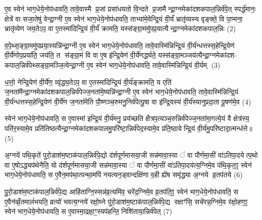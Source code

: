 ए॒व स्वेन॑ भाग॒धेये॒नोप॑धावति॒ तावे॒वास्मै प्र॒जां प्रसा॑धयतो वि॒न्दते प्र॒जामैन्द्रा॒ग्नमेका॑दशकपाल॒न्निर्व॑पे॒त् स्पर्द्ध॑मानः॒ क्षेत्रे॑ वा सजा॒तेषु॑ वेन्द्रा॒ग्नी ए॒व स्वेन॑ भाग॒धेये॒नोप॑धावति॒ ताभ्या॑मे॒वेन्द्रि॒यं वी॒र्यं॑ भ्रातृ॑व्यस्य वृङ्क्ते॒ वि पा॒प्मना॒ भ्रातृ॑व्येण जय॒तेऽप॒ वा ए॒तस्मा॑दिन्द्रि॒यं वी॒र्यं॑ क्रामति॒ यस्स॑ङ्ग्रा॒ममु॑पप्र॒यात्यैन्द्रा॒ग्नमेका॑दशकपाल॒न्निः (2)

व॒पे॒थ्स॒ङ्ग्रा॒ममु॑पप्रया॒स्यन्नि॑न्द्रा॒ग्नी ए॒व स्वेन॑ भाग॒धेये॒नोप॑धावति॒ तावे॒वास्मि॑न्निन्द्रि॒यं वी॒र्य॑न्धत्तस्स॒हेन्द्रि॒येण॑ वी॒र्ये॑णोप॒प्रया॑ति॒ जय॑ति॒ त स॑ङ्ग्रा॒मं वि वा ए॒ष इ॑न्द्रि॒येण॑ वी॒र्ये॑णर्द्ध्यते॒ यस्स॑ङ्ग्रा॒मञ्जय॑त्यैन्द्रा॒ग्नमेका॑दश- कपाल॒न्निर्व॑पेथ्सङ्ग्रा॒मञ्जि॒त्वेन्द्रा॒ग्नी ए॒व स्वेन॑ भाग॒धेये॒नोप॑धावति॒ तावे॒वास्मि॑न्निन्द्रि॒यं वी॒र्यम् (3)

ध॒त्तो॒ नेन्द्रि॒येण॑ वी॒र्ये॑ण॒ व्यृ॑द्ध्य॒तेऽप॒ वा ए॒तस्मा॑दिन्द्रि॒यं वी॒र्य॑ङ्क्रामति॒ य एति॑ ज॒नता॑मैन्द्रा॒ग्नमेका॑दशकपाल॒न्निर्व॑पेज्ज॒नता॑मे॒ष्यन्नि॑न्द्रा॒ग्नी ए॒व स्वेन॑ भाग॒धेये॒नोप॑धावति॒ तावे॒वास्मि॑न्निन्द्रि॒यं वी॒र्य॑न्धत्तस्स॒हेन्द्रि॒येण॑ वी॒र्ये॑ण ज॒नता॑मेति पौ॒ष्णञ्च॒रुमनु॒निर्व॑पेत्पू॒षा वा इ॑न्द्रि॒यस्य॑ वी॒र्य॑स्यानुप्रदा॒ता पू॒षण॑मे॒व (4)

स्वेन॑ भाग॒धेये॒नोप॑धावति॒ स ए॒वास्मा॑ इन्द्रि॒यं वी॒र्य॑मनु॒ प्रय॑च्छति क्षैत्रप॒त्यञ्च॒रुन्निर्व॑पेज्ज॒नता॑मा॒गत्ये॒यं वै क्षेत्र॑स्य॒ पति॑र॒स्यामे॒व प्रति॑तिष्ठत्यैन्द्रा॒ग्नमेका॑दशकपालमु॒परि॑ष्टा॒न्निर्व॑पेद॒स्यामे॒व प्र॑ति॒ष्ठायेन्द्रि॒यं वी॒र्य॑मु॒परि॑ष्टादा॒त्मन्ध॑त्ते॥ (5)

{\anuvakamend[{प्र॒जाका॑म इन्द्रा॒ग्नी उ॑पप्र॒यात्यैन्द्रा॒ग्नमेका॑दशकपाल॒न्निर्वी॒र्यं॑ पू॒षण॑मे॒वैका॒न्नच॑त्वारि॒ꣳ॒शच्च॑॥1।}]}

अ॒ग्नये॑ पथि॒कृते॑ पुरो॒डाश॑म॒ष्टाक॑पाल॒न्निर्व॑पे॒द्यो द॑र्\mbox{}शपूर्णमासया॒जी सन्न॑मावा॒स्यां वा पौर्णमा॒सीं वा॑ऽतिपा॒दयेत्प॒थो वा ए॒षोऽद्ध्यप॑थेनैति॒ यो द॑र्\mbox{}शपूर्णमासया॒जी सन्न॑मावा॒स्यां वा पौर्णमा॒सीं वा॑ऽतिपा॒दय॑त्य॒ग्निमे॒व प॑थि॒कृत॒ꣵ॒ स्वेन॑ भाग॒धेये॒नोप॑धावति॒ स ए॒वैन॒मप॑था॒त्पन्था॒मपि॑ नयत्यन॒ड्वान्दक्षि॑णा व॒ही ह्ये॑ष समृ॑द्ध्या अ॒ग्नये व्र॒तप॑तये (6)

पु॒रो॒डाश॑म॒ष्टाक॑पाल॒न्निर्व॑पे॒द्य आहि॑ताग्नि॒स्सन्न॑व्र॒त्यमि॑व॒ चरे॑द॒ग्निमे॒व व्र॒तप॑ति॒ꣵ॒ स्वेन॑ भाग॒धेये॒नोप॑धावति॒ स ए॒वैन॑व्व्रँ॒तमालं॑भयति॒ व्रत्यो॑ भवत्य॒ग्नये॑ रक्षो॒घ्ने पु॑रो॒डाश॑म॒ष्टाक॑पाल॒न्निर्व॑पे॒द्य रक्षाꣳ॑सि॒ सचे॑रन्न॒ग्निमे॒व र॑क्षो॒हण॒ꣵ॒ स्वेन॑ भाग॒धेये॒नोप॑धावति॒ स ए॒वास्मा॒द्रक्षा॒ꣳ॒स्यप॑हन्ति॒ निशि॑ताया॒न्निर्व॑पेत् (7)

